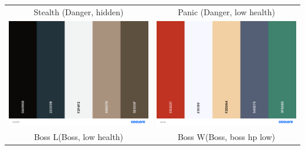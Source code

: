 \documentclass[10pt,a4paper]{article}
\begin{document}
\begin{tabular}{c c}
Stealth (Danger, hidden)&Panic (Danger, low health)\\
\includegraphics[scale=0.1]{stealth}&\includegraphics[scale=0.1]{panic}\\
Boss L(Boss, low health)&Boss W(Boss, boss hp low)\\

\end{tabular}
\end{document}
